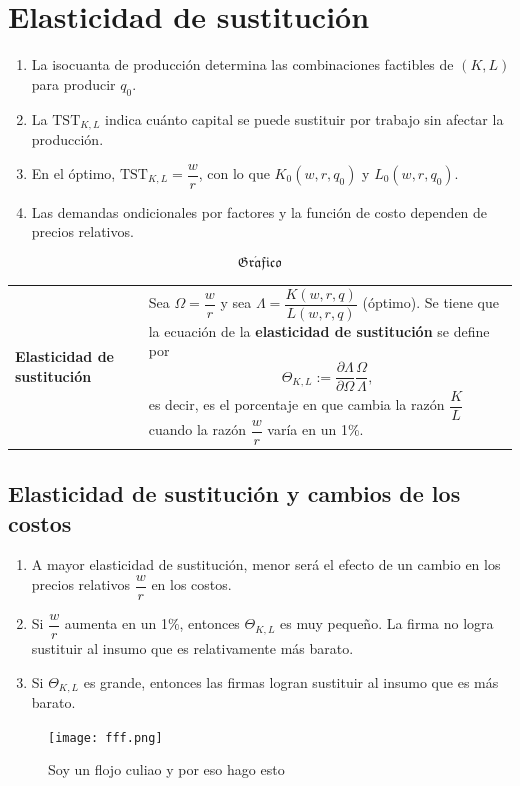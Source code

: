 \documentclass{report}
\newcommand{\GRAF}{\begin{center}$$\mathfrak{Gr\acute{a}fico}$$\end{center}}
\newenvironment{definition}[1]{\begin{center}
\begin{tabular}{p{3.5cm} p{12.5cm}}
\textbf{#1} &
}
{\\ \end{tabular}\end{center}}
\begin{document}

\section{Elasticidad de sustitución}

\begin{enumerate}
\item La isocuanta de producción determina las combinaciones factibles de $\left(K,L\right)$ para producir $q_0$.
\item La $\mathrm{TST}_{K,L}$ indica cuánto capital se puede sustituir por trabajo sin afectar la producción.
\item En el óptimo, $\mathrm{TST}_{K,L}=\dfrac{w}{r}$, con lo que $K_0\!\left(w,r,q_0\right)$ y $L_0\!\left(w,r,q_0\right)$.
\item Las demandas ondicionales por factores y la función de costo dependen de precios relativos.
\end{enumerate}

\GRAF

\begin{definition}{Elasticidad de sustitución}
Sea $\Omega=\dfrac{w}{r}$ y sea $\Lambda=\dfrac{K\!\left(w,r,q\right)}{L\!\left(w,r,q\right)}$ (óptimo). Se tiene que la ecuación de la \textbf{elasticidad de sustitución} se define por
\[
\Theta_{K,L}:=\frac{\partial\Lambda}{\partial\Omega}\frac{\Omega}{\Lambda}\text{,}
\]
es decir, es el porcentaje en que cambia la razón $\dfrac{K}{L}$ cuando la razón $\dfrac{w}{r}$ varía en un 1\%.
\end{definition}

\subsection{Elasticidad de sustitución y cambios de los costos}

\begin{enumerate}
\item A mayor elasticidad de sustitución, menor será el efecto de un cambio en los precios relativos $\dfrac{w}{r}$ en los costos.
\item Si $\dfrac{w}{r}$ aumenta en un 1\%, entonces $\Theta_{K,L}$ es muy pequeño. La firma no logra sustituir al insumo que es relativamente más barato.
\item Si $\Theta_{K,L}$ es grande, entonces las firmas logran sustituir al insumo que es más barato.
\end{enumerate}

\begin{figure}[H]
\begin{center}
\texttt{[image: fff.png]}
\end{center}
\caption{Soy un flojo culiao y por eso hago esto}
\end{figure}
\end{document}
